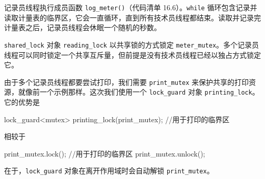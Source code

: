 记录员线程执行成员函数 \texttt{log\_\allowbreak{}meter(\allowbreak{})\allowbreak{}}（代码清单 16.6）。\texttt{while} 循环包含记录并读取计量表的临界区，它会一直循环，直到所有技术员线程都结束。读取并记录完计量表之后，记录员线程会休眠一个随机的秒数。

\texttt{shared\_\allowbreak{}lock} 对象 \texttt{reading\_\allowbreak{}lock} 以共享锁的方式锁定 \texttt{meter\_\allowbreak{}mutex}。多个记录员线程可以同时锁定一个共享互斥量，但前提是没有技术员线程已经以独占方式锁定它。

由于多个记录员线程都要尝试打印，我们需要 \texttt{print\_\allowbreak{}mutex} 来保护共享的打印资源，就像前一个示例那样。这次我们使用一个 \texttt{lock\_\allowbreak{}guard} 对象 \texttt{printing\_\allowbreak{}lock}。它的优势是

\begin{codebox}
 {
     lock_guard<mutex> printing_lock(print_mutex);
     {
         //用于打印的临界区
     }
 }
\end{codebox}

相较于

\begin{codebox}
 print_mutex.lock();
 {
     //用于打印的临界区
 }
 print_mutex.unlock();
\end{codebox}

在于，\texttt{lock\_\allowbreak{}guard} 对象在离开作用域时会自动解锁 \texttt{print\_\allowbreak{}mutex}。

